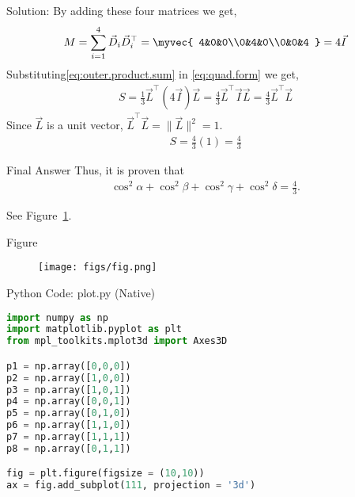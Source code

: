 \documentclass{beamer}
\begin{document}
\begin{frame}{Solution: }
\noindent
By adding these four matrices we get,
\begin{align}
	M = \sum_{i=1}^{4} \vec{D}_i \vec{D}_i^\top = \myvec{ 4&0&0\\0&4&0\\0&0&4 } = 4\vec{I}
    \label{eq:outer.product.sum}
\end{align}
Substituting\eqref{eq:outer.product.sum} in \eqref{eq:quad.form} we get,
\begin{align}
	S = \frac{1}{3} \vec{L}^\top (4\vec{I}) \vec{L} = \frac{4}{3} \vec{L}^\top \vec{I} \vec{L} = \frac{4}{3} \vec{L}^\top \vec{L}
\end{align}
Since $\vec{L}$ is a unit vector, $\vec{L}^\top \vec{L} = \|\vec{L}\|^2 = 1$.
\begin{align}
    S = \frac{4}{3}(1) = \frac{4}{3}
\end{align}

\end{frame}

\begin{frame}{Final Answer}
\noindent
Thus, it is proven that 
\begin{align*}
\cos^2\alpha + \cos^2\beta + \cos^2\gamma + \cos^2\delta = \frac{4}{3}.
\end{align*}

See Figure~\ref{fig:3DVectors}.   
\end{frame}

\begin{frame}{Figure}
    \begin{figure}[h!]
    \centering
    \texttt{[image: figs/fig.png]}
    \caption{}
    \label{fig:3DVectors}
\end{figure}
\end{frame}

\begin{frame}[fragile]{Python Code: plot.py (Native)}
\begin{lstlisting}[language=Python]
import numpy as np
import matplotlib.pyplot as plt
from mpl_toolkits.mplot3d import Axes3D

p1 = np.array([0,0,0])
p2 = np.array([1,0,0])
p3 = np.array([1,0,1])
p4 = np.array([0,0,1])
p5 = np.array([0,1,0])
p6 = np.array([1,1,0])
p7 = np.array([1,1,1])
p8 = np.array([0,1,1])

fig = plt.figure(figsize = (10,10))
ax = fig.add_subplot(111, projection = '3d')
\end{lstlisting}
\end{frame}
\end{document}
